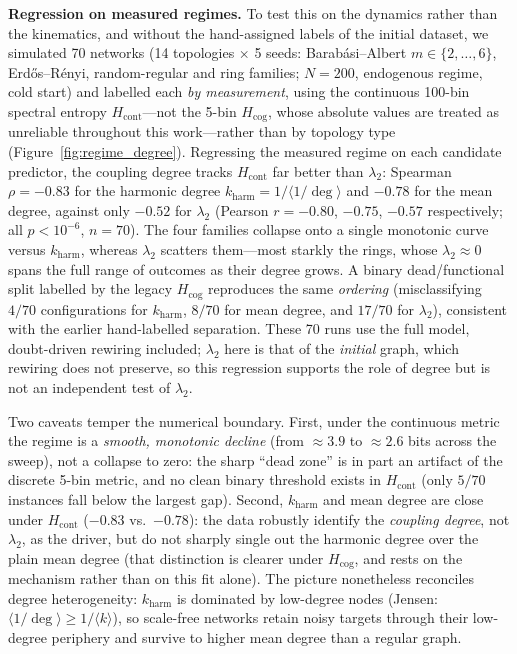 ﻿\documentclass[11pt]{article}
\begin{document}
\textbf{Regression on measured regimes.} To test this on the dynamics rather than the kinematics, and without the hand-assigned labels of the initial dataset, we simulated 70 networks (14 topologies $\times$ 5 seeds: Barab\'asi--Albert $m \in \{2,\dots,6\}$, Erd\H{o}s--R\'enyi, random-regular and ring families; $N = 200$, endogenous regime, cold start) and labelled each \emph{by measurement}, using the continuous 100-bin spectral entropy $H_{\mathrm{cont}}$---not the 5-bin $H_{\mathrm{cog}}$, whose absolute values are treated as unreliable throughout this work---rather than by topology type (Figure~\ref{fig:regime_degree}). Regressing the measured regime on each candidate predictor, the coupling degree tracks $H_{\mathrm{cont}}$ far better than $\lambda_2$: Spearman $\rho = -0.83$ for the harmonic degree $k_{\mathrm{harm}} = 1/\langle 1/\deg\rangle$ and $-0.78$ for the mean degree, against only $-0.52$ for $\lambda_2$ (Pearson $r = -0.80$, $-0.75$, $-0.57$ respectively; all $p < 10^{-6}$, $n = 70$). The four families collapse onto a single monotonic curve versus $k_{\mathrm{harm}}$, whereas $\lambda_2$ scatters them---most starkly the rings, whose $\lambda_2 \approx 0$ spans the full range of outcomes as their degree grows. A binary dead/functional split labelled by the legacy $H_{\mathrm{cog}}$ reproduces the same \emph{ordering} (misclassifying $4/70$ configurations for $k_{\mathrm{harm}}$, $8/70$ for mean degree, and $17/70$ for $\lambda_2$), consistent with the earlier hand-labelled separation. These 70 runs use the full model, doubt-driven rewiring included; $\lambda_2$ here is that of the \emph{initial} graph, which rewiring does not preserve, so this regression supports the role of degree but is not an independent test of $\lambda_2$.

Two caveats temper the numerical boundary. First, under the continuous metric the regime is a \emph{smooth, monotonic decline} (from $\approx 3.9$ to $\approx 2.6$ bits across the sweep), not a collapse to zero: the sharp ``dead zone'' is in part an artifact of the discrete 5-bin metric, and no clean binary threshold exists in $H_{\mathrm{cont}}$ (only $5/70$ instances fall below the largest gap). Second, $k_{\mathrm{harm}}$ and mean degree are close under $H_{\mathrm{cont}}$ ($-0.83$ vs.\ $-0.78$): the data robustly identify the \emph{coupling degree}, not $\lambda_2$, as the driver, but do not sharply single out the harmonic degree over the plain mean degree (that distinction is clearer under $H_{\mathrm{cog}}$, and rests on the mechanism rather than on this fit alone). The picture nonetheless reconciles degree heterogeneity: $k_{\mathrm{harm}}$ is dominated by low-degree nodes (Jensen: $\langle 1/\deg\rangle \ge 1/\langle k\rangle$), so scale-free networks retain noisy targets through their low-degree periphery and survive to higher mean degree than a regular graph.
\end{document}
